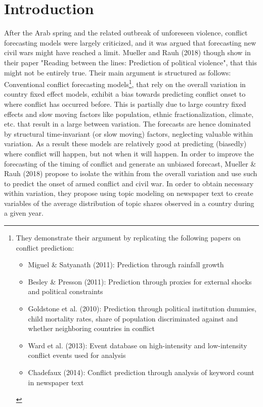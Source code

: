 \renewcommand{\contentsname}{Table of Contents}
\tableofcontents
\clearpage

\section{Introduction}
After the Arab spring and the related outbreak of unforeseen violence, conflict forecasting models were largely criticized, and it was argued that forecasting new civil wars might have reached a limit.
Mueller and Rauh (2018) though show in their paper "Reading between the lines: Prediction of political violence", that this might not be entirely true.
Their main argument is structured as follows: Conventional conflict forecasting models\footnote{\noindent They demonstrate their argument by replicating the following papers on conflict prediction: \begin{itemize}
    \item Miguel \& Satyanath (2011): Prediction through rainfall growth
    \item Besley \& Presson (2011): Prediction through proxies for external shocks and political constraints
    \item Goldstone et al. (2010): Prediction through political institution dummies, child mortality rates, share of population discriminated against and whether neighboring countries in conflict
    \item Ward et al. (2013): Event database on high-intensity and low-intensity conflict events used for analysis
    \item Chadefaux (2014): Conflict prediction through analysis of keyword count in newspaper text
\end{itemize}}, that rely on the overall variation in country fixed effect models, exhibit a bias towards predicting conflict onset to where conflict has occurred before. This is partially due to large country fixed effects and slow moving factors like population, ethnic fractionalization, climate, etc. that result in a large between variation. The forecasts are hence dominated by structural time-invariant (or slow moving) factors, neglecting valuable within variation. As a result these models are relatively good at predicting (biasedly) where conflict will happen, but not when it will happen. In order to improve the forecasting of the timing of conflict and generate an unbiased forecast, Mueller \& Rauh (2018) propose to isolate the within from the overall variation and use such to predict the onset of armed conflict and civil war. In order to obtain necessary within variation, they propose using topic modeling on newspaper text to create variables of the average distribution of topic shares observed in a country during a given year.



